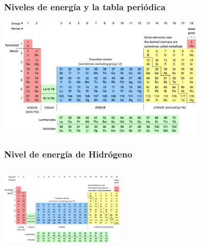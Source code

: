 \documentclass{beamer}
\begin{document}
\begin{frame}
    \frametitle{Niveles de energía y la tabla periódica}
    \includegraphics[width=10cm]{../../../../public/images/pTable.png}
\end{frame}

\begin{frame}
    \frametitle{Nivel de energía de Hidrógeno}
    \begin{columns}
        
        \begin{column}{0.5\textwidth}
            \includegraphics[width=6cm]{../../../../public/images/pTable.png}
            
        \end{column}
        \begin{column}{0.5\textwidth}

            
        \end{column}
    \end{columns}

\end{frame}
\end{document}
